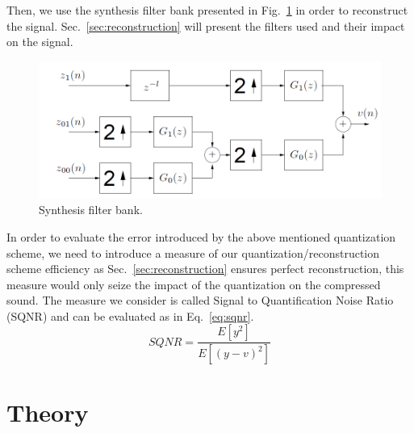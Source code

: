 \documentclass[a4paper,twocolumn]{article}
\begin{document}
Then, we use the synthesis filter bank presented in Fig.~\ref{fig:synthesis} in order to reconstruct the signal. Sec.~\ref{sec:reconstruction} will present the filters used and their impact on the signal.

\begin{figure}[!ht]
  \begin{center}
    \includegraphics[width=0.83\columnwidth]{synthesys.png}
  \end{center}
  \caption{Synthesis filter bank.}
  \label{fig:synthesis}
\end{figure}

In order to evaluate the error introduced by the above mentioned quantization scheme, we need to introduce a measure of our quantization/reconstruction scheme efficiency as Sec.~\ref{sec:reconstruction} ensures perfect reconstruction, this measure would only seize the impact of the quantization on the compressed sound.
The measure we consider is called Signal to Quantification Noise Ratio (SQNR) and can be evaluated as in Eq.~\ref{eq:sqnr}. 
\begin{equation}
  \label{eq:sqnr}
  SQNR= \frac{E[y^2]}{E[\left(y-v\right)^2]}
\end{equation}




\section{Theory}
\label{sec:theory}
\end{document}
